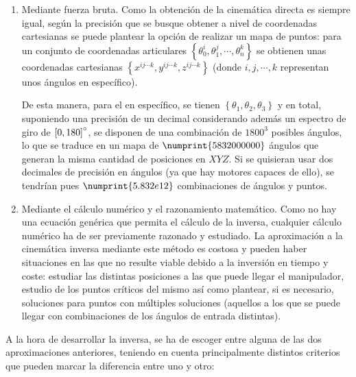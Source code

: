 \begin{enumerate}
    \item Mediante fuerza bruta. Como la obtención de la cinemática directa es siempre
          igual, según la precisión que se busque obtener a nivel de coordenadas cartesianas
          se puede plantear la opción de realizar un mapa de puntos: para un conjunto de
          coordenadas articulares $\left\{\theta_0^i,\theta_1^j,\cdots,\theta_n^k\right\}$ se
          obtienen unas coordenadas cartesianas
          $\left\{x^{ij\cdots k}, y^{ij\cdots k}, z^{ij\cdots k}\right\}$
          (donde $i,j,\cdots,k$ representan unos ángulos en específico).

          De esta manera, para el \pArm{} en específico, se tienen
          $\left\{\theta_1, \theta_2, \theta_3\right\}$ y en total, suponiendo una precisión
          de un decimal considerando además un espectro de giro de $\left[0,180\right]\degree$,
          se disponen de una combinación de $1800^3$ posibles ángulos, lo que se traduce
          en un mapa de $\numprint{5832000000}$ ángulos que generan la misma cantidad de posiciones
          en $XYZ$. Si se quisieran usar dos decimales de precisión en ángulos (ya que hay motores capaces
          de ello), se tendrían pues $\numprint{5.832e12}$ combinaciones de ángulos y puntos.

    \item Mediante el cálculo numérico y el razonamiento matemático. Como no hay una
          ecuación genérica que permita el cálculo de la inversa, cualquier cálculo numérico ha
          de ser previamente razonado y estudiado. La aproximación a la cinemática inversa
          mediante este método es costosa y pueden haber situaciones en las que no resulte
          viable debido a la inversión en tiempo y coste: estudiar las distintas posiciones
          a las que puede llegar el manipulador, estudio de los puntos críticos del mismo
          así como plantear, si es necesario, soluciones para puntos con múltiples soluciones
          (aquellos a los que se puede llegar con combinaciones de los ángulos de entrada
          distintas).
\end{enumerate}

A la hora de desarrollar la inversa, se ha de escoger entre alguna de las dos aproximaciones
anteriores, teniendo en cuenta principalmente distintos criterios que pueden marcar la
diferencia entre uno y otro:

